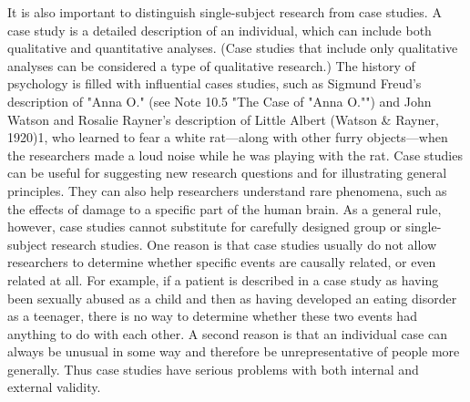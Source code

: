 It is also important to distinguish single-subject research from case studies. A case study is a detailed description of an individual, which can include both qualitative and quantitative analyses. (Case studies that include only qualitative analyses can be considered a type of qualitative research.) The history of psychology is filled with influential cases studies, such as Sigmund Freud's description of "Anna O." (see Note 10.5 "The Case of "Anna O."") and John Watson and Rosalie Rayner's description of Little Albert (Watson \& Rayner, 1920)1, who learned to fear a white rat---along with other furry objects---when the researchers made a loud noise while he was playing with the rat. Case studies can be useful for suggesting new research questions and for illustrating general principles. They can also help researchers understand rare phenomena, such as the effects of damage to a specific part of the human brain. As a general rule, however, case studies cannot substitute for carefully designed group or single-subject research studies. One reason is that case studies usually do not allow researchers to determine whether specific events are causally related, or even related at all. For example, if a patient is described in a case study as having been sexually abused as a child and then as having developed an eating disorder as a teenager, there is no way to determine whether these two events had anything to do with each other. A second reason is that an individual case
can always be unusual in some way and therefore be unrepresentative of people more generally. Thus case studies have serious problems with both internal and external validity.

